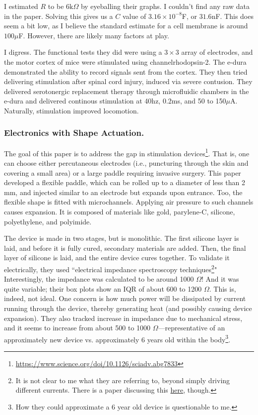 \documentclass[12pt]{report}
\begin{document}
I estimated $R$ to be $6\mathrm{k}\Omega$ by eyeballing their graphs. I couldn't find any raw data in the paper. Solving this gives us a $C$ value of $3.16\times10^{-8}$F, or $31.6$nF. This does seem a bit low, as I believe the standard estimate for a cell membrane is around $100\mu$F. However, there are likely many factors at play.\newline

I digress. The functional tests they did were using a $3\times3$ array of electrodes, and the motor cortex of mice were stimulated using channelrhodopsin-2. The e-dura demonstrated the ability to record signals sent from the cortex. They then tried delivering stimulation after spinal cord injury, induced via severe contusion. They delivered serotonergic replacement therapy through microfluidic chambers in the e-dura and delivered continous stimulation at 40hz, 0.2ms, and 50 to 150$\mu$A. Naturally, stimulation improved locomotion. 

\subsubsection{Electronics with Shape Actuation.}

The goal of this paper is to address the gap in stimulation devices\footnote{\url{https://www.science.org/doi/10.1126/sciadv.abg7833}}. That is, one can choose either percutaneous electrodes (i.e., puncturing through the skin and covering a small area) or a large paddle requiring invasive surgery. This paper developed a flexible paddle, which can be rolled up to a diameter of less than 2 mm, and injected similar to an electrode but expands upon entrance. Too, the flexible shape is fitted with microchannels. Applying air pressure to such channels causes expansion. It is composed of materials like gold, parylene-C, silicone, polyethylene, and polyimide.\newline 

The device is made in two stages, but is monolithic. The first silicone layer is laid, and before it is fully cured, secondary materials are added. Then, the final layer of silicone is laid, and the entire device cures together. To validate it electrically, they used ``electrical impedance spectroscopy techniques\footnote{It is not clear to me what they are referring to, beyond simply driving different currents. There is a paper discussing this \href{https://www.ncbi.nlm.nih.gov/pmc/articles/PMC8512860/}{here}, though.}" Interestingly, the impedance was calculated to be around 1000 $\Omega$! And it was quite variable; their box plots show an IQR of about 600 to 1200 $\Omega$. This is, indeed, not ideal. One concern is how much power will be dissipated by current running through the device, thereby generating heat (and possibly causing device expansion). They also tracked increase in impedance due to mechanical stress, and it seems to increase from about 500 to 1000 $\Omega$---representative of an approximately new device vs. approximately 6 years old within the body\footnote{How they could approximate a 6 year old device is questionable to me.}.\newline
\end{document}
